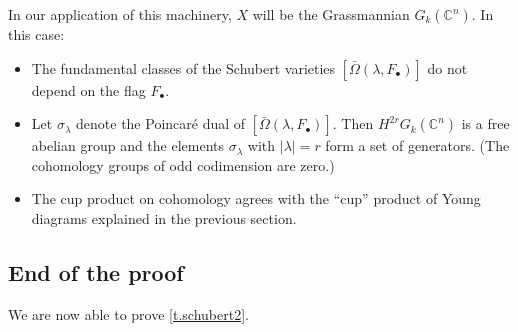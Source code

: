 \documentclass[10pt, a4paper]{amsart}
\theoremstyle{plain}
\theoremstyle{definition}
\theoremstyle{remark}
\theoremstyle{note}
\numberwithin{equation}{section}
\begin{document}
\medskip

In our application of this machinery, $X$ will be the Grassmannian $G_k({\mathbb{C}}^n)$.
In this case:
\begin{itemize}
\item The fundamental classes of the Schubert varieties $[\bar\Omega(\lambda, F_\bullet)]$
do not depend on the flag $F_\bullet$.
\item Let $\sigma_\lambda$ denote the Poincar\'e dual of $[\bar\Omega(\lambda, F_\bullet)]$.
Then $H^{2r} G_k({\mathbb{C}}^n)$ is a free abelian group and the elements $\sigma_\lambda$
with $|\lambda| = r$ form a set of generators.
(The cohomology groups of odd codimension are zero.)
\item The cup product on cohomology agrees with the ``cup'' product of Young diagrams 
explained in the previous section.
\end{itemize}

\subsection{End of the proof}\label{ss.end}

We are now able to prove \cref{t.schubert2}. 
\end{document}
